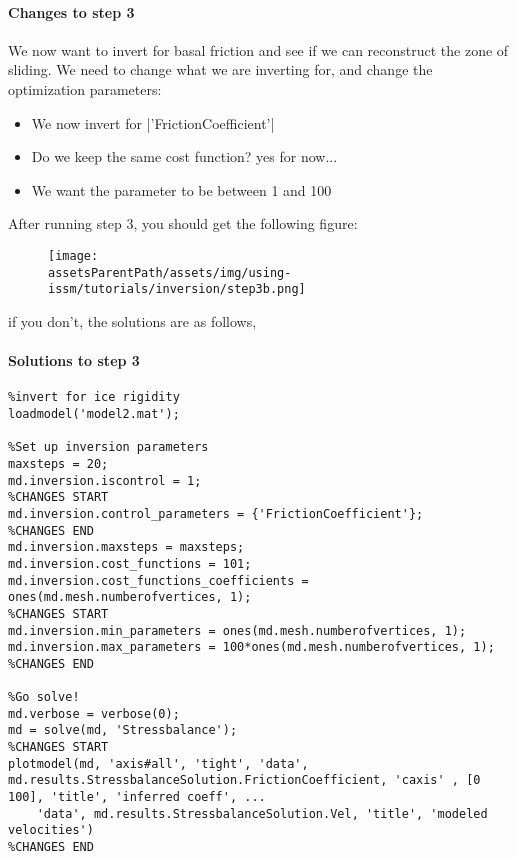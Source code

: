 \paragraph{Changes to step 3}
We now want to invert for basal friction and see if we can reconstruct the zone of sliding. We need to change what we are inverting for, and change the optimization parameters:
\begin{itemize}
	\item We now invert for \lstinlinebg|'FrictionCoefficient'|
	\item Do we keep the same cost function? yes for now...
	\item We want the parameter to be between 1 and 100
\end{itemize}
After running step 3, you should get the following figure:
\begin{figure}[H]
	\begin{center}
		\texttt{[image: \\assetsParentPath/assets/img/using-issm/tutorials/inversion/step3b.png]}
	\end{center}
\end{figure}
if you don't, the solutions are as follows,

\paragraph{Solutions to step 3}
\begin{lstlisting}
%invert for ice rigidity
loadmodel('model2.mat');

%Set up inversion parameters
maxsteps = 20;
md.inversion.iscontrol = 1;
%CHANGES START
md.inversion.control_parameters = {'FrictionCoefficient'};
%CHANGES END
md.inversion.maxsteps = maxsteps;
md.inversion.cost_functions = 101;
md.inversion.cost_functions_coefficients = ones(md.mesh.numberofvertices, 1);
%CHANGES START
md.inversion.min_parameters = ones(md.mesh.numberofvertices, 1);
md.inversion.max_parameters = 100*ones(md.mesh.numberofvertices, 1);
%CHANGES END

%Go solve!
md.verbose = verbose(0);
md = solve(md, 'Stressbalance');
%CHANGES START
plotmodel(md, 'axis#all', 'tight', 'data', md.results.StressbalanceSolution.FrictionCoefficient, 'caxis' , [0 100], 'title', 'inferred coeff', ...
	'data', md.results.StressbalanceSolution.Vel, 'title', 'modeled velocities')
%CHANGES END
\end{lstlisting}

